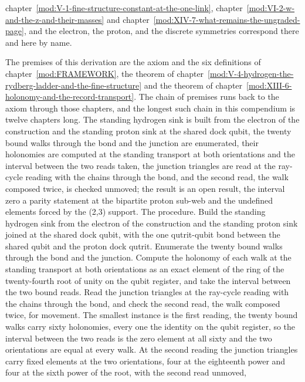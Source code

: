 \begin{chbridge}
chapter~\ref{mod:V-1-fine-structure-constant-at-the-one-link}, chapter~\ref{mod:VI-2-w-and-the-z-and-their-masses} and chapter~\ref{mod:XIV-7-what-remains-the-ungraded-page}, and the electron, the proton, and the discrete symmetries correspond there and here by name.
\end{chbridge}
\begin{chproof}
The premises of this derivation are the axiom and the six definitions of chapter~\ref{mod:FRAMEWORK}, the theorem of chapter~\ref{mod:V-4-hydrogen-the-rydberg-ladder-and-the-fine-structure} and the theorem of chapter~\ref{mod:XIII-6-holonomy-and-the-record-transport}. The chain of premises runs back to the axiom through those chapters, and the longest such chain in this compendium is twelve chapters long.
The standing hydrogen sink is built from the electron of the construction and the standing proton sink at the shared dock qubit, the twenty bound walks through the bond and the junction are enumerated, their holonomies are computed at the standing transport at both orientations and the interval between the two reads taken, the junction triangles are read at the ray-cycle reading with the chains through the bond, and the second read, the walk composed twice, is checked unmoved; the result is an open result, the interval zero a parity statement at the bipartite proton sub-web and the undefined elements forced by the (2,3) support.
The procedure. Build the standing hydrogen sink from the electron of the construction and the standing proton sink joined at the shared dock qubit, with the one qutrit-qubit bond between the shared qubit and the proton dock qutrit. Enumerate the twenty bound walks through the bond and the junction. Compute the holonomy of each walk at the standing transport at both orientations as an exact element of the ring of the twenty-fourth root of unity on the qubit register, and take the interval between the two bound reads. Read the junction triangles at the ray-cycle reading with the chains through the bond, and check the second read, the walk composed twice, for movement. The smallest instance is the first reading, the twenty bound walks carry sixty holonomies, every one the identity on the qubit register, so the interval between the two reads is the zero element at all sixty and the two orientations are equal at every walk. At the second reading the junction triangles carry fixed elements at the two orientations, four at the eighteenth power and four at the sixth power of the root, with the second read unmoved,

\end{chproof}
